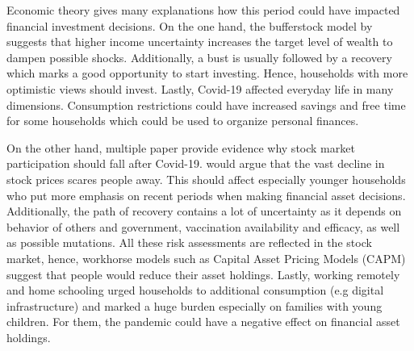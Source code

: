 \documentclass[ProjectABM]{subfiles}
\begin{document}


Economic theory gives many explanations how this period could have impacted financial investment decisions. On the one hand, the bufferstock model by \cite{carroll2009bufferstock} suggests that higher income uncertainty increases the target level of wealth to dampen possible shocks. %
Additionally, a bust is usually followed by a recovery which marks a good opportunity to start investing. Hence, households with more optimistic views should invest. Lastly, Covid-19 affected everyday life in many dimensions. Consumption restrictions could have increased savings and free time for some households which could be used to organize personal finances. 

On the other hand, multiple paper provide evidence why stock market participation should fall after Covid-19. \cite{malmendier_2011} would argue that the vast decline in stock prices scares people away. This should affect especially younger households who put more emphasis on recent periods when making financial asset decisions. Additionally, the path of recovery contains a lot of uncertainty as it depends on behavior of others and government, vaccination availability and efficacy, as well as possible mutations. All these risk assessments are reflected in the stock market, hence, workhorse models such as Capital Asset Pricing Models (CAPM) suggest that people would reduce their asset holdings. Lastly, working remotely and home schooling urged households to additional consumption (e.g digital infrastructure) and marked a huge burden especially on families with young children. For them, the pandemic could have a negative effect on financial asset holdings.
\end{document}
